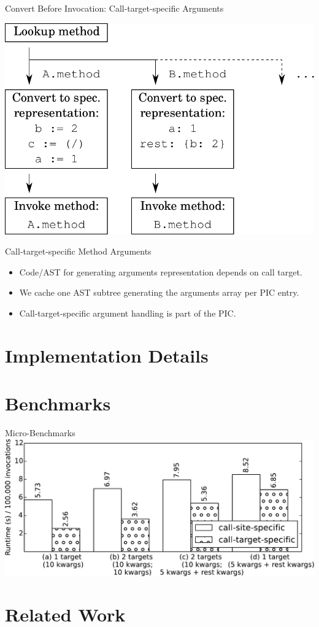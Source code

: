 \documentclass[xcolor=dvipsname]{beamer} %
\begin{document}
\begin{frame}[fragile]{Convert Before Invocation: Call-target-specific Arguments}
\begin{minipage}{0.55\textwidth}
\centering
\includegraphics[height=0.6\textheight]{convert_before3.pdf}
\end{minipage} %
\begin{minipage}{0.4\textwidth}

\end{minipage}
\end{frame}

\begin{frame}{Call-target-specific Method Arguments}
\begin{itemize}
	\item Code/AST for generating arguments representation depends on call target.
	\item We cache one AST subtree generating the arguments array per PIC entry.
	\item Call-target-specific argument handling is part of the PIC.
\end{itemize}
\end{frame}

\section{Implementation Details}

\section{Benchmarks}
\begin{frame}{Micro-Benchmarks}
	\centering
	\includegraphics[width=\textwidth]{benchmark.pdf}
\end{frame}

\section{Related Work}
\end{document}
